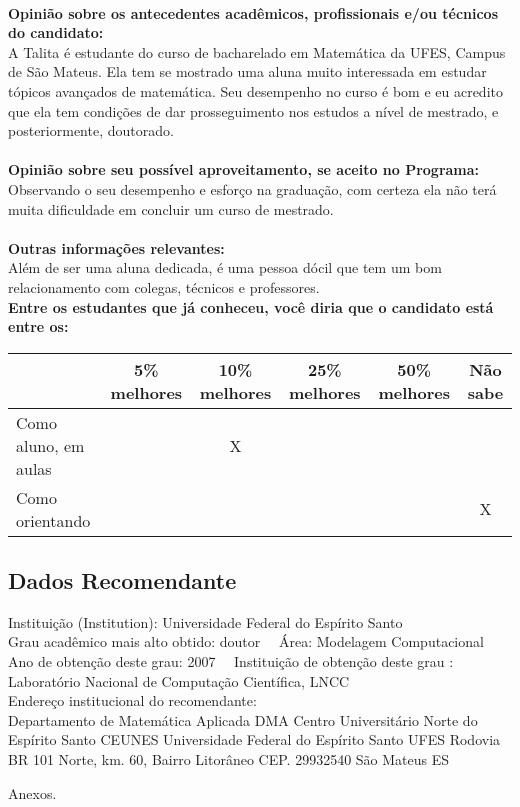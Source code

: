 \documentclass[11pt]{article}
\begin{document}
\\
\textbf{Opinião sobre os antecedentes acadêmicos, profissionais e/ou técnicos do candidato:}
\\A Talita é estudante do curso de bacharelado em Matemática da UFES, Campus de São Mateus. Ela tem se mostrado uma aluna muito interessada em estudar tópicos avançados de matemática. Seu desempenho no curso é bom e eu acredito que ela tem condições de dar prosseguimento nos estudos a nível de mestrado, e posteriormente, doutorado.\\
\\
\textbf{Opinião sobre seu possível aproveitamento, se aceito no Programa:}
\\Observando o seu desempenho e esforço na graduação, com certeza ela não terá muita dificuldade em concluir um curso de mestrado.\\ 
\\
\textbf{Outras informações relevantes:} \\Além de ser uma aluna dedicada, é uma pessoa dócil que tem um bom relacionamento com colegas, técnicos e professores.
\\[0.3cm]
\textbf{Entre os estudantes que já conheceu, você diria que o candidato está entre os:}
\\
\begin{tabular}{|l|c|c|c|c|c|}
\hline
 & 5\% melhores & 10\% melhores & 25\% melhores & 50\% melhores & Não sabe \\
\hline
Como aluno, em aulas &  & X &  &  & \\
\hline
Como orientando &  &  &  &  & X\\
\hline
\end{tabular}
\subsection*{Dados Recomendante} 
	Instituição (Institution): Universidade Federal do Espírito Santo
\\ 
	Grau acadêmico mais alto obtido: doutor
	\ \ Área: Modelagem Computacional
	\\
	Ano de obtenção deste grau: 2007
	\ \ 
	Instituição de obtenção deste grau : Laboratório Nacional de Computação Científica, LNCC
	\\ 
	Endereço institucional do recomendante: \\ Departamento de Matemática Aplicada  DMA
Centro Universitário Norte do Espírito Santo  CEUNES
Universidade Federal do Espírito Santo  UFES
Rodovia BR 101 Norte, km. 60, Bairro Litorâneo
CEP. 29932540 São Mateus  ES  
\begin{center}
Anexos.
\end{center}
\end{document}
